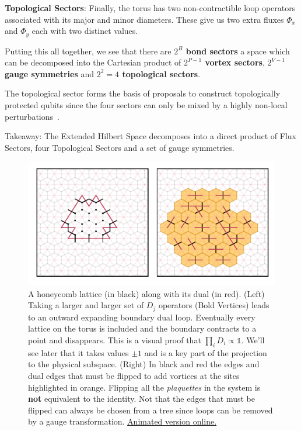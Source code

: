 \textbf{Topological Sectors}: Finally, the torus has two non-contractible loop operators associated with its major and minor diameters. These give us two extra fluxes \(\Phi_x\) and \(\Phi_y\) each with two distinct values.

Putting this all together, we see that there are \textbf{\(2^B\) bond sectors} a space which can be decomposed into the Cartesian product of \textbf{\(2^{P-1}\) vortex sectors}, \textbf{\(2^{V-1}\) gauge symmetries} and \textbf{\(2^2 = 4\) topological sectors}.

The topological sector forms the basis of proposals to construct topologically protected qubits since the four sectors can only be mixed by a highly non-local perturbations~\autocite{kitaevFaulttolerantQuantumComputation2003}.

Takeaway: The Extended Hilbert Space decomposes into a direct product of Flux Sectors, four Topological Sectors and a set of gauge symmetries.

\hypertarget{fig:flood_fill}{%
\begin{figure}
\centering
\includegraphics[width=1\textwidth,height=\textheight]{figure_code/amk_chapter/intro/flood_fill/flood_fill}
\caption[{Gauge Operators}]{A honeycomb lattice (in black) along with its dual (in red). (Left) Taking a larger and larger set of \(D_j\) operators (Bold Vertices) leads to an outward expanding boundary dual loop. Eventually every lattice on the torus is included and the boundary contracts to a point and disappears. This is a visual proof that \(\prod_i D_i \propto \mathbb{1}\). We'll see later that it takes values \(\pm 1\) and is a key part of the projection to the physical subspace. (Right) In black and red the edges and dual edges that must be flipped to add vortices at the sites highlighted in orange. Flipping all the \emph{plaquettes} in the system is \textbf{not} equivalent to the identity. Not that the edges that must be flipped can always be chosen from a tree since loops can be removed by a gauge transformation. \href{http://thomashodson.com/assets/thesis/figure_code/amk_chapter/intro/flood_fill/flood_fill.gif}{ Animated version online.}}
\label{fig:flood_fill}
\end{figure}
}

